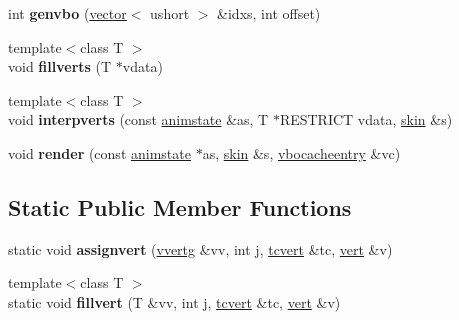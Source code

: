 \begin{DoxyCompactItemize}
int {\bfseries genvbo} (\hyperlink{structvector}{vector}$<$ ushort $>$ \&idxs, int offset)
\item 
\mbox{\label{structvertmodel_1_1vertmesh_ad6ec3aac85d0d2db41498cb479087a9c}} 
{\footnotesize template$<$class T $>$ }\\void {\bfseries fillverts} (T $\ast$vdata)
\item 
\mbox{\label{structvertmodel_1_1vertmesh_a7b49e9e2e12a6779f8b427aeb9f0db45}} 
{\footnotesize template$<$class T $>$ }\\void {\bfseries interpverts} (const \hyperlink{structanimmodel_1_1animstate}{animstate} \&as, T $\ast$R\+E\+S\+T\+R\+I\+CT vdata, \hyperlink{structanimmodel_1_1skin}{skin} \&s)
\item 
\mbox{\label{structvertmodel_1_1vertmesh_abe070fc364140d6ae382b45c834d89c7}} 
void {\bfseries render} (const \hyperlink{structanimmodel_1_1animstate}{animstate} $\ast$as, \hyperlink{structanimmodel_1_1skin}{skin} \&s, \hyperlink{structvertmodel_1_1vbocacheentry}{vbocacheentry} \&vc)
\end{DoxyCompactItemize}
\subsection*{Static Public Member Functions}
\begin{DoxyCompactItemize}
\item 
\mbox{\label{structvertmodel_1_1vertmesh_a9888ee796a0d4c5cb3ccbbf4e08dab2b}} 
static void {\bfseries assignvert} (\hyperlink{structvertmodel_1_1vvertg}{vvertg} \&vv, int j, \hyperlink{structvertmodel_1_1tcvert}{tcvert} \&tc, \hyperlink{structvertmodel_1_1vert}{vert} \&v)
\item 
\mbox{\label{structvertmodel_1_1vertmesh_ab241db4fd849c8784d8ef47119002750}} 
{\footnotesize template$<$class T $>$ }\\static void {\bfseries fillvert} (T \&vv, int j, \hyperlink{structvertmodel_1_1tcvert}{tcvert} \&tc, \hyperlink{structvertmodel_1_1vert}{vert} \&v)
\end{DoxyCompactItemize}
